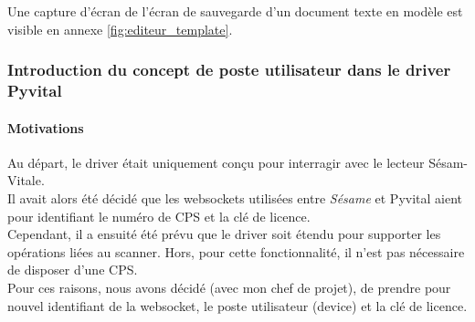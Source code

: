 Une capture d'écran de l'écran de sauvegarde d'un document texte en modèle est visible en annexe \ref{fig:editeur_template}.

		
\subsubsection{Introduction du concept de poste utilisateur dans le driver Pyvital}
\paragraph*{Motivations\\}
Au départ, le driver était uniquement conçu pour interragir avec le lecteur Sésam-Vitale.\\ Il avait alors été décidé que les websockets utilisées entre \textit{Sésame} et Pyvital aient pour identifiant le numéro de \gls{CPS} et la clé de licence.\\
Cependant, il a ensuité été prévu que le driver soit étendu pour supporter les opérations liées au scanner. Hors, pour cette fonctionnalité, il n'est pas nécessaire de disposer d'une CPS.\\
Pour ces raisons, nous avons décidé (avec mon chef de projet), de prendre pour nouvel identifiant de la websocket, le poste utilisateur (device) et la clé de licence. 

